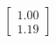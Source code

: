 \documentclass[preview]{standalone}
\begin{document}
\begin{align*}
\begin{bmatrix} 1.00 \\ 1.19 \end{bmatrix}
\end{align*}
\end{document}
